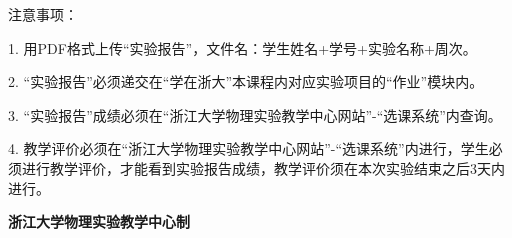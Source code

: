\documentclass[10pt,a4paper]{ctexart} %
\begin{document}
\vspace*{\fill} %
\noindent
\begin{minipage}{\textwidth}
  注意事项：

  \begingroup
    \setlength{\leftskip}{2em} %
    1. 用PDF格式上传“实验报告”，文件名：学生姓名+学号+实验名称+周次。

    2. “实验报告”必须递交在“学在浙大”本课程内对应实验项目的“作业”模块内。

    3. “实验报告”成绩必须在“浙江大学物理实验教学中心网站”-“选课系统”内查询。

    4. 教学评价必须在“浙江大学物理实验教学中心网站”-“选课系统”内进行，学生必须进行教学评价，才能看到实验报告成绩，教学评价须在本次实验结束之后3天内进行。\par
    \endgroup

  \begin{center}
    {\bfseries 浙江大学物理实验教学中心制}
  \end{center}
\end{minipage}
\end{document}
